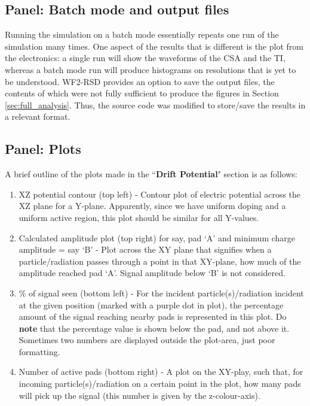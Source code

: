 \documentclass[11pt]{article}
\begin{document}
\subsection{Panel: Batch mode and output files}
Running the simulation on a batch mode essentially repeats one run of the simulation many times. One aspect of the results that is different is the plot from the electronics: a single run will show the waveforms of the CSA and the TI, whereas a batch mode run will produce histograms on resolutions that is yet to be understood.
\newline
WF2-RSD provides an option to save the output files, the contents of which were not fully sufficient to produce the figures in Section \ref{sec:full_analysis}. Thus, the source code was modified to store/save the results in a relevant format.

\subsection{Panel: Plots}
A brief outline of the plots made in the ``\textbf{Drift Potential}" section is as follows:
\begin{enumerate}
    \item XZ potential contour (top left) - Contour plot of electric potential across the XZ plane for a Y-plane. Apparently, since we have uniform doping and a uniform active region, this plot should be similar for all Y-values.
    \item Calculated amplitude plot (top right) for say, pad `A' and minimum charge amplitude = say `B' - Plot across the XY plane that signifies when a particle/radiation passes through a point in that XY-plane, how much of the amplitude reached pad `A'. Signal amplitude below `B' is not considered.
    \item \% of signal seen (bottom left) - For the incident particle(s)/radiation incident at the given position (marked with a purple dot in plot), the percentage amount of the signal reaching nearby pads is represented in this plot. Do \textbf{note} that the percentage value is shown below the pad, and not above it. Sometimes two numbers are displayed outside the plot-area, just poor formatting.
    \item Number of active pads (bottom right) - A plot on the XY-play, such that, for incoming particle(s)/radiation on a certain point in the plot, how many pads will pick up the signal (this number is given by the z-colour-axis).
\end{enumerate}
\end{document}
